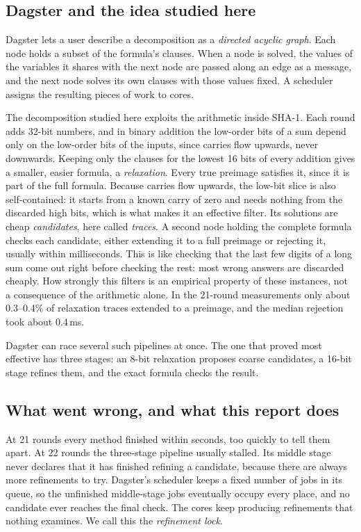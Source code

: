 \documentclass[11pt,a4paper]{article}
\begin{document}
\subsection{Dagster and the idea studied here}

Dagster \cite{burgess2022dagster,burgess2023dagster} lets a user describe a decomposition as a \emph{directed acyclic graph}. Each
node holds a subset of the formula's clauses. When a node is solved, the values of the variables it
shares with the next node are passed along an edge as a message, and the next node solves its own
clauses with those values fixed. A scheduler assigns the resulting pieces of work to cores.

The decomposition studied here exploits the arithmetic inside SHA-1. Each round adds 32-bit numbers,
and in binary addition the low-order bits of a sum depend only on the low-order bits of the inputs,
since carries flow upwards, never downwards. Keeping only the clauses for the lowest 16 bits of every
addition gives a smaller, easier formula, a \emph{relaxation}. Every true preimage satisfies it,
since it is part of the full formula. Because carries flow upwards, the low-bit slice is also
self-contained: it starts from a known carry of zero and needs nothing from the discarded high bits,
which is what makes it an effective filter. Its solutions are cheap \emph{candidates}, here called \emph{traces}. A second node
holding the complete formula checks each candidate, either extending it to a full preimage or
rejecting it, usually within milliseconds. This is like checking that the last few digits of a long
sum come out right before checking the rest: most wrong answers are discarded cheaply. How strongly
this filters is an empirical property of these instances, not a consequence of the arithmetic
alone. In the 21-round measurements only about 0.3--0.4\% of relaxation traces extended to a
preimage, and the median rejection took about 0.4\,ms.

Dagster can race several such pipelines at once. The one that proved most effective has three
stages: an 8-bit relaxation proposes coarse candidates, a 16-bit stage refines them, and the exact
formula checks the result.

\subsection{What went wrong, and what this report does}

At 21 rounds every method finished within seconds, too quickly to tell them apart. At 22 rounds the
three-stage pipeline usually stalled. Its middle stage never declares that it has finished refining
a candidate, because there are always more refinements to try. Dagster's scheduler keeps a fixed
number of jobs in its queue, so the unfinished middle-stage jobs eventually occupy every place, and
no candidate ever reaches the final check. The cores keep producing refinements that nothing
examines. We call this the \emph{refinement lock}.
\end{document}

